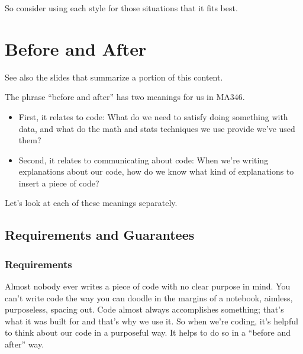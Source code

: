 \documentclass[letterpaper,10pt,english]{sphinxmanual}
\begin{document}
So consider using each style for those situations that it fits best.


\chapter{Before and After}
\label{\detokenize{chapter-5-before-and-after:before-and-after}}\label{\detokenize{chapter-5-before-and-after::doc}}
See also the slides that summarize a portion of this content.

The phrase “before and after” has two meanings for us in MA346.
\begin{itemize}
\item {} 
First, it relates to code:  What  do we need to satisfy  doing something with data, and what  do the math and stats techniques we use provide  we’ve used them?

\item {} 
Second, it relates to communicating about code:  When we’re writing explanations about our code, how do we know what kind of explanations to insert  a piece of code?

\end{itemize}

Let’s look at each of these meanings separately.


\section{Requirements and Guarantees}
\label{\detokenize{chapter-5-before-and-after:requirements-and-guarantees}}

\subsection{Requirements}
\label{\detokenize{chapter-5-before-and-after:requirements}}
Almost nobody ever writes a piece of code with no clear purpose in mind.  You can’t write code the way you can doodle in the margins of a notebook, aimless, purposeless, spacing out.  Code almost always accomplishes something; that’s what it was built for and that’s why we use it.  So when we’re coding, it’s helpful to think about our code in a purposeful way.  It helps to do so in a “before and after” way.
\end{document}
